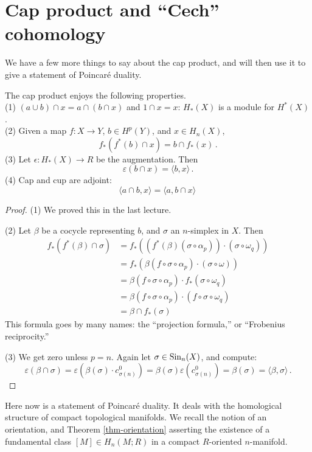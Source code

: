 \section{Cap product and ``Cech'' cohomology}

We have a few more things to say about the cap product, and will then use it
to give a statement of Poincar\'e duality. 

\begin{prop}
The cap product enjoys the following properties.\\
(1) $(a\cup b)\cap x=a\cap(b\cap x)$ and $1\cap x=x$: $H_*(X)$ is a module for
$H^*(X)$.\\
(2) Given a map $f:X\to Y$, $b\in H^p(Y)$, and $x\in H_n(X)$, 
\[
f_*(f^*(b)\cap x)=b\cap f_*(x)\,.
\]
(3) Let $\epsilon:H_*(X)\to R$ be the augmentation. Then 
\[
\varepsilon(b\cap x)=\langle b,x\rangle\,.
\]
(4) Cap and cup are adjoint:
\[
\langle a\cap b,x\rangle=\langle a,b\cap x\rangle\,
\]
\end{prop}
\begin{proof}
(1) We proved this in the last lecture.

\noindent
(2) Let $\beta$ be a cocycle representing $b$, and $\sigma$ an $n$-simplex
in $X$. Then
\begin{align*}
f_\ast(f^\ast(\beta)\cap\sigma)& =f_\ast(\left(f^\ast(\beta)(\sigma\circ\alpha_p)\right)\cdot(\sigma\circ\omega_q))\\
& =f_\ast(\beta(f\circ\sigma\circ\alpha_p)\cdot(\sigma\circ\omega))\\
& =\beta(f\circ\sigma\circ\alpha_p)\cdot f_\ast(\sigma\circ\omega_q)\\
& = \beta(f\circ\sigma\circ\alpha_p)\cdot(f\circ\sigma\circ\omega_q)\\
& = \beta\cap f_\ast(\sigma)
\end{align*}
This formula goes by many names: the ``projection formula,'' or ``Frobenius
reciprocity.'' 

\noindent
(3) We get zero unless $p=n$. Again let $\sigma\in\mathrm{Sin}_n(X)$, and compute:
\[
\varepsilon(\beta\cap\sigma)=\varepsilon(\beta(\sigma)\cdot c^0_{\sigma(n)})=\beta(\sigma)\varepsilon(c^0_{\sigma(n)})=\beta(\sigma)=\langle \beta,\sigma\rangle
\,.
\]
\end{proof}

Here now is a statement of Poincar\'e duality. It deals with the 
homological structure of compact topological manifolds. We recall the
notion of an orientation, and Theorem \ref{thm-orientation} asserting
the existence of a fundamental class $[M]\in H_n(M;R)$ in a compact
$R$-oriented $n$-manifold.

